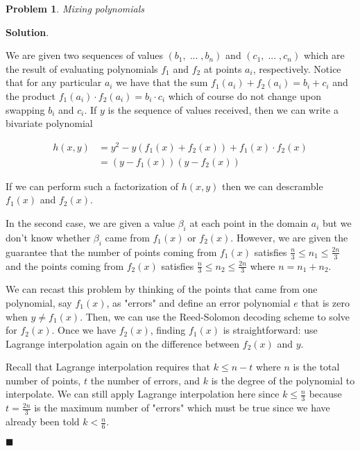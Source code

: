\documentclass[12pt]{article}
\newtheorem{p}{Problem}[section]
\theoremstyle{definition}
\newenvironment{s}{%
        \begin{trivlist} \item \textbf{Solution}. }{%
            \hspace*{\fill} $\blacksquare$\end{trivlist}}%
\begin{document}
{\begin{p}
Mixing polynomials
\end{p}

\begin{s}

We are given two sequences of values $(b_{1}, \;...\;, b_{n})$ and $(c_{1}, \;...\;, c_{n})$ which are the result of evaluating polynomials $f_{1}$ and $f_{2}$ at points $a_{i}$, respectively. Notice that for any particular $a_{i}$ we have that the sum $f_{1}(a_{i}) + f_{2}(a_{i}) = b_{i} + c_{i}$ and the product $f_{1}(a_{i})\cdot f_{2}(a_{i}) = b_{i}\cdot c_{i}$ which of course do not change upon swapping $b_{i}$ and $c_{i}$. If $y$ is the sequence of values received, then we can write a bivariate polynomial

\begin{align*}
h(x,y) &= y^{2} - y(f_{1}(x)+f_{2}(x)) + f_{1}(x)\cdot f_{2}(x)\\
&= (y-f_{1}(x))(y-f_{2}(x))
\end{align*}

If we can perform such a factorization of $h(x,y)$ then we can descramble $f_{1}(x)$ and $f_{2}(x)$. 

In the second case, we are given a value $\beta_{i}$ at each point in the domain $a_{i}$ but we don't know whether $\beta_{i}$ came from $f_{1}(x)$ or $f_{2}(x)$. However, we are given the guarantee that the number of points coming from $f_{1}(x)$ satisfies $\frac{n}{3} \leq n_{1} \leq \frac{2n}{3}$ and the points coming from $f_{2}(x)$ satisfies $\frac{n}{3} \leq n_{2} \leq \frac{2n}{3}$ where $n = n_{1} + n_{2}$. 

We can recast this problem by thinking of the points that came from one polynomial, say $f_{1}(x)$, as "errors" and define an error polynomial $e$ that is zero when $y \neq f_{1}(x)$. Then, we can use the Reed-Solomon decoding scheme to solve for $f_{2}(x)$. Once we have $f_{2}(x)$, finding $f_{1}(x)$ is straightforward: use Lagrange interpolation again on the difference between $f_{2}(x)$ and $y$. 

Recall that Lagrange interpolation requires that $k\leq n-t$ where $n$ is the total number of points, $t$ the number of errors, and $k$ is the degree of the polynomial to interpolate. We can still apply Lagrange interpolation here since $k \leq \frac{n}{3}$ because $t=\frac{2n}{3}$ is the maximum number of "errors" which must be true since we have already been told $k < \frac{n}{6}$.


\end{s}
\end{document}

